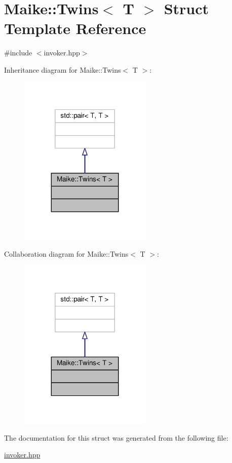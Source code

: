 \hypertarget{struct_maike_1_1_twins}{}\section{Maike\+:\+:Twins$<$ T $>$ Struct Template Reference}
\label{struct_maike_1_1_twins}


{\ttfamily \#include $<$invoker.\+hpp$>$}



Inheritance diagram for Maike\+:\+:Twins$<$ T $>$\+:\nopagebreak
\begin{figure}[H]
\begin{center}
\leavevmode
\includegraphics[width=179pt]{struct_maike_1_1_twins__inherit__graph}
\end{center}
\end{figure}


Collaboration diagram for Maike\+:\+:Twins$<$ T $>$\+:\nopagebreak
\begin{figure}[H]
\begin{center}
\leavevmode
\includegraphics[width=179pt]{struct_maike_1_1_twins__coll__graph}
\end{center}
\end{figure}


The documentation for this struct was generated from the following file\+:\begin{DoxyCompactItemize}
\item 
\hyperlink{invoker_8hpp}{invoker.\+hpp}\end{DoxyCompactItemize}

